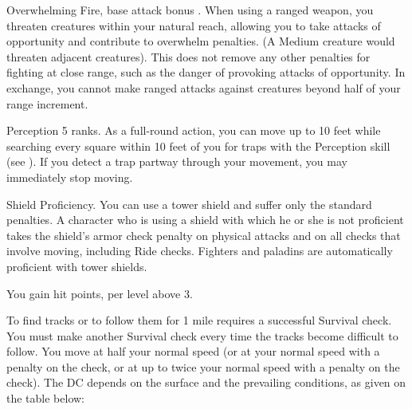 \featpre Overwhelming Fire, base attack bonus .
\featben When using a ranged weapon, you threaten creatures within your natural reach, allowing you to take attacks of opportunity and contribute to overwhelm penalties. (A Medium creature would threaten adjacent creatures). This does not remove any other penalties for fighting at close range, such as the danger of provoking attacks of opportunity. In exchange, you cannot make ranged attacks against creatures beyond half of your range increment.

\featpre Perception 5 ranks.
\featben As a full-round action, you can move up to 10 feet while searching every square within 10 feet of you for traps with the Perception skill (see ). If you detect a trap partway through your movement, you may immediately stop moving.

 Shield Proficiency.
 You can use a tower shield and suffer only the standard penalties.
 A character who is using a shield with which he or she is not proficient takes the shield's armor check penalty on physical attacks and on all checks that involve moving, including Ride checks.
 Fighters and paladins are automatically proficient with tower shields.

 You gain  hit points,  per level above 3.

 To find tracks or to follow them for 1 mile requires a successful Survival check. You must make another Survival check every time the tracks become difficult to follow.
You move at half your normal speed (or at your normal speed with a  penalty on the check, or at up to twice your normal speed with a  penalty on the check). The DC depends on the surface and the prevailing conditions, as given on the table below:

